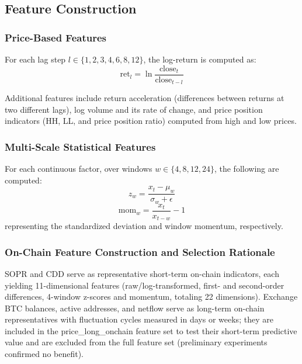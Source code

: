 \documentclass[a4paper]{cas-dc}
\begin{document}
\subsection{Feature Construction}

\subsubsection{Price-Based Features}

For each lag step $l \in \{1,2,3,4,6,8,12\}$, the log-return is computed as:
\begin{equation}
\text{ret}_l = \ln \frac{\text{close}_t}{\text{close}_{t-l}}
\end{equation}

Additional features include return acceleration (differences between returns at two different lags), log volume and its rate of change, and price position indicators (HH, LL, and price position ratio) computed from high and low prices.

\subsubsection{Multi-Scale Statistical Features}

For each continuous factor, over windows $w \in \{4,8,12,24\}$, the following are computed:
\begin{equation}
z_w = \frac{x_t - \mu_w}{\sigma_w + \epsilon}
\end{equation}
\begin{equation}
\text{mom}_w = \frac{x_t}{x_{t-w}} - 1
\end{equation}
representing the standardized deviation and window momentum, respectively.

\subsubsection{On-Chain Feature Construction and Selection Rationale}

SOPR and CDD serve as representative short-term on-chain indicators, each yielding 11-dimensional features (raw/log-transformed, first- and second-order differences, 4-window z-scores and momentum, totaling 22 dimensions). Exchange BTC balances, active addresses, and netflow serve as long-term on-chain representatives with fluctuation cycles measured in days or weeks; they are included in the price\_long\_onchain feature set to test their short-term predictive value and are excluded from the full feature set (preliminary experiments confirmed no benefit).
\end{document}

